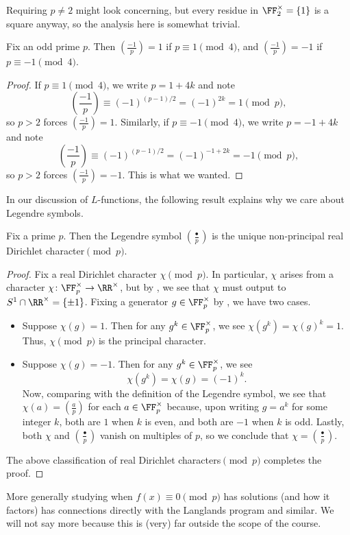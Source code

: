 \documentclass[../notes.tex]{subfiles}
\begin{document}
\begin{remark}
	Requiring $p\ne2$ might look concerning, but every residue in $\FF_2^\times=\{1\}$ is a square anyway, so the analysis here is somewhat trivial.
\end{remark}
\begin{corollary}
	Fix an odd prime $p$. Then $\left(\frac{-1}p\right)=1$ if $p\equiv1\pmod 4$, and $\left(\frac{-1}p\right)=-1$ if $p\equiv-1\pmod 4$.
\end{corollary}
\begin{proof}
	If $p\equiv1\pmod4$, we write $p=1+4k$ and note
	\[\left(\frac{-1}p\right)\equiv(-1)^{(p-1)/2}=(-1)^{2k}=1\pmod p,\]
	so $p>2$ forces $\left(\frac{-1}p\right)=1$. Similarly, if $p\equiv-1\pmod4$, we write $p=-1+4k$ and note
	\[\left(\frac{-1}p\right)\equiv(-1)^{(p-1)/2}=(-1)^{-1+2k}=-1\pmod p,\]
	so $p>2$ forces $\left(\frac{-1}p\right)=-1$. This is what we wanted.
\end{proof}
In our discussion of $L$-functions, the following result explains why we care about Legendre symbols.
\begin{proposition}
	Fix a prime $p$. Then the Legendre symbol $\left(\frac\bullet p\right)$ is the unique non-principal real Dirichlet character$\pmod p$.
\end{proposition}
\begin{proof}
	Fix a real Dirichlet character $\chi\pmod p$. In particular, $\chi$ arises from a character $\chi\colon\FF_p^\times\to\RR^\times$, but by , we see that $\chi$ must output to $S^1\cap\RR^\times=\{\pm1\}$. Fixing a generator $g\in\FF_p^\times$ by , we have two cases.
	\begin{itemize}
		\item Suppose $\chi(g)=1$. Then for any $g^k\in\FF_p^\times$, we see $\chi\left(g^k\right)=\chi(g)^k=1$. Thus, $\chi\pmod p$ is the principal character.
		\item Suppose $\chi(g)=-1$. Then for any $g^k\in\FF_p^\times$, we see
		\[\chi\left(g^k\right)=\chi(g)=(-1)^k.\]
		Now, comparing  with the definition of the Legendre symbol, we see that $\chi(a)=\left(\frac ap\right)$ for each $a\in\FF_p^\times$ because, upon writing $g=a^k$ for some integer $k$, both are $1$ when $k$ is even, and both are $-1$ when $k$ is odd. Lastly, both $\chi$ and $\left(\frac\bullet p\right)$ vanish on multiples of $p$, so we conclude that $\chi=\left(\frac\bullet p\right)$.
	\end{itemize}
	The above classification of real Dirichlet characters$\pmod p$ completes the proof.
\end{proof}
\begin{remark}
	More generally studying when $f(x)\equiv0\pmod p$ has solutions (and how it factors) has connections directly with the Langlands program and similar. We will not say more because this is (very) far outside the scope of the course.
\end{remark}
\end{document}
